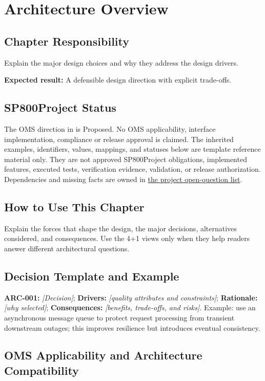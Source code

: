 \chapter{Architecture Overview}
\section{Chapter Responsibility}
\label{Section:ArchitectureOverviewResponsibility}
Explain the major design choices and why they address the design drivers.

\noindent\textbf{Expected result:} A defensible design direction with explicit trade-offs.

\section{SP800Project Status}
\label{Section:SP800StatusArchitectureOverview}
The OMS direction in  is Proposed. No OMS applicability,
interface implementation, compliance or release approval is claimed. The inherited examples,
identifiers, values, mappings, and statuses below are template reference
material only. They are not approved SP800Project obligations, implemented features,
executed tests, verification evidence, validation, or release authorization.
Dependencies and missing facts are owned in
\hyperref[Section:SP800OpenQuestions]{the project open-question list}.

\section{How to Use This Chapter}
Explain the forces that shape the design, the major decisions, alternatives considered, and consequences. Use the 4+1 views only when they help readers answer different architectural questions.
\section{Decision Template and Example}
\textbf{ARC-001:} \textit{[Decision]}; \textbf{Drivers:} \textit{[quality attributes and constraints]}; \textbf{Rationale:} \textit{[why selected]}; \textbf{Consequences:} \textit{[benefits, trade-offs, and risks]}. Example: use an asynchronous message queue to protect request processing from transient downstream outages; this improves resilience but introduces eventual consistency.

\section{OMS Applicability and Architecture Compatibility}
\label{Section:OMSArchitectureDecision}

